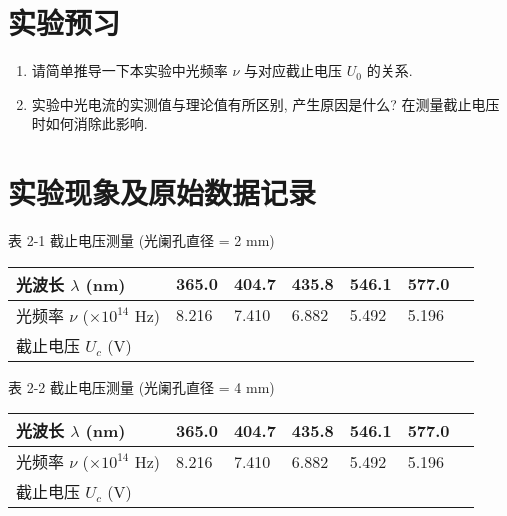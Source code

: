 \documentclass[signature=preparation]{physicsreport}
\begin{document}
\maketitle

\section{实验预习}
\begin{enumerate}
    \item 请简单推导一下本实验中光频率 $\nu$ 与对应截止电压 $U_0$ 的关系.
    \item 实验中光电流的实测值与理论值有所区别, 产生原因是什么? 在测量截止电压时如何消除此影响.
\end{enumerate}

\makeatletter
{}
\makeatother

\newpage
\section{实验现象及原始数据记录}
\vspace*{1.7em}

{\small\selectfont \centering 表 2-1 截止电压测量 (光阑孔直径 = 2 mm) \par}
\begin{table*}[ht]
    \renewcommand{\arraystretch}{1.4}
    \small\selectfont
    \centering
    \begin{tabularx}{\textwidth}{|l|Y|Y|Y|Y|Y|Y|} \hline
        光波长 $\lambda$ (nm)              & 365.0 & 404.7 & 435.8 & 546.1 & 577.0 \\\hline
        光频率 $\nu$ ($\times 10^{14}$ Hz) & 8.216 & 7.410 & 6.882 & 5.492 & 5.196 \\\hline
        截止电压 $U_c$ (V)                  &       &       &       &       &       \\\hline
    \end{tabularx}
\end{table*}

{\small\selectfont \centering 表 2-2 截止电压测量 (光阑孔直径 = 4 mm) \par}
\begin{table*}[ht]
    \renewcommand{\arraystretch}{1.4}
    \small\selectfont
    \centering
    \begin{tabularx}{\textwidth}{|l|Y|Y|Y|Y|Y|Y|} \hline
        光波长 $\lambda$ (nm)              & 365.0 & 404.7 & 435.8 & 546.1 & 577.0 \\\hline
        光频率 $\nu$ ($\times 10^{14}$ Hz) & 8.216 & 7.410 & 6.882 & 5.492 & 5.196 \\\hline
        截止电压 $U_c$ (V)                  &       &       &       &       &       \\\hline
    \end{tabularx}
\end{table*}
\end{document}
